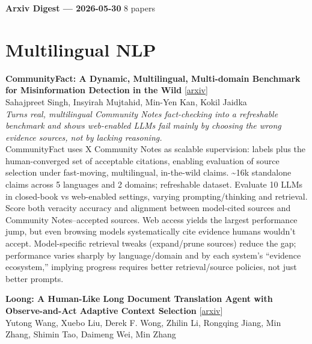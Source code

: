 \documentclass[12pt,letterpaper]{article}
\begin{document}
{\footnotesize\textbf{Arxiv Digest --- 2026-05-30} \hfill 8 papers}

\smallskip

\section*{Multilingual NLP}

{\small\textbf{CommunityFact: A Dynamic, Multilingual, Multi-domain Benchmark for Misinformation Detection in the Wild}} {\scriptsize[\href{https://arxiv.org/abs/2605.30241}{arxiv}]}\\
{\scriptsize Sahajpreet Singh, Insyirah Mujtahid, Min-Yen Kan, Kokil Jaidka}\\

{\small\textit{Turns real, multilingual Community Notes fact-checking into a refreshable benchmark and shows web-enabled LLMs fail mainly by choosing the wrong evidence sources, not by lacking reasoning.}}\\[1pt]
{\footnotesize CommunityFact uses X Community Notes as scalable supervision: labels plus the human-converged set of acceptable citations, enabling evaluation of source selection under fast-moving, multilingual, in-the-wild claims. \textasciitilde{}16k standalone claims across 5 languages and 2 domains; refreshable dataset. Evaluate 10 LLMs in closed-book vs web-enabled settings, varying prompting/thinking and retrieval. Score both veracity accuracy and alignment between model-cited sources and Community Notes--accepted sources. Web access yields the largest performance jump, but even browsing models systematically cite evidence humans wouldn't accept. Model-specific retrieval tweaks (expand/prune sources) reduce the gap; performance varies sharply by language/domain and by each system's ``evidence ecosystem,'' implying progress requires better retrieval/source policies, not just better prompts.}

\medskip

{\small\textbf{Loong: A Human-Like Long Document Translation Agent with Observe-and-Act Adaptive Context Selection}} {\scriptsize[\href{https://arxiv.org/abs/2605.30274}{arxiv}]}\\
{\scriptsize Yutong Wang, Xuebo Liu, Derek F. Wong, Zhilin Li, Rongqing Jiang, Min Zhang, Shimin Tao, Daimeng Wei, Min Zhang}\\
\end{document}
